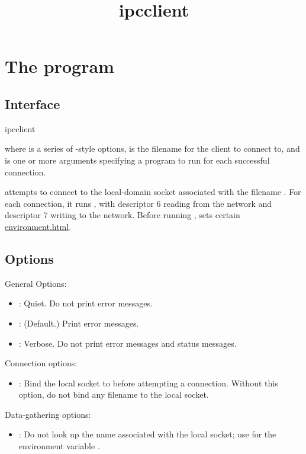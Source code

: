 \documentclass{book}
\title{ipcclient}
\begin{document}
\section{The  program}

\subsection{Interface}
\begin{code}%
  ipcclient   
\end{code}
where  is a series of -style options,
 is the filename for the client to connect to, and
 is one or more arguments specifying a program to run for
each successful connection.

 attempts to connect to the local-domain socket
associated with the filename .  For each connection, it runs
, with descriptor 6 reading from the network and descriptor
7 writing to the network.  Before running , 
sets certain \href{environment variables}{environment.html}.

\subsection{Options}
General Options:
\begin{itemize}
\item {}: Quiet.  Do not print error messages.
\item {}: (Default.)  Print error messages.
\item {}: Verbose.  Do not print error messages and status messages.
\end{itemize}

Connection options:
\begin{itemize}
\item {}: Bind the local socket to
   before attempting a connection.  Without this
  option, do not bind any filename to the local socket.
\end{itemize}

Data-gathering options:
\begin{itemize}
\item {}: Do not look up the name associated
  with the local socket; use  for the environment
  variable .
\end{itemize}
\end{document}
